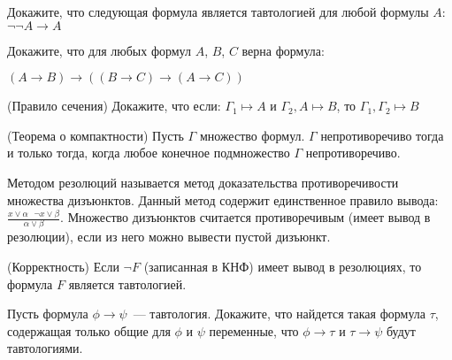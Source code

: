 \setcounter{curtask}{7}


\begin{task}
    Докажите, что следующая формула является тавтологией для любой
    формулы $A$: $\neg\neg A \rightarrow A$
\end{task}

\begin{task}
    Докажите, что для любых формул $A$, $B$, $C$ верна формула:
    \begin{center}
        $(A \rightarrow B) \rightarrow ((B \rightarrow C) \rightarrow (A
	    \rightarrow C))$
    \end{center}
\end{task}

\begin{task} (Правило сечения)
    Докажите, что если: $\Gamma_1 \mapsto A$ и $\Gamma_2, A \mapsto
    B$, то $\Gamma_1, \Gamma_2 \mapsto B$
\end{task}

\begin{task} (Теорема о компактности)
    Пусть $\Gamma$ множество формул. $\Gamma$ непротиворечиво тогда и
    только тогда, когда любое конечное подмножество $\Gamma$ непротиворечиво.
\end{task}

\vspace{0.5cm}
Методом резолюций называется метод доказательства противоречивости
множества дизъюнктов. Данный метод содержит единственное правило
вывода: $\frac{x \vee \alpha \ \ \ \neg x \vee \beta}{\alpha \vee
  \beta}$. Множество дизъюнктов считается противоречивым (имеет вывод
в резолюции), если из него можно вывести пустой дизъюнкт.

\begin{task} (Корректность)
    Если $\neg F$ (записанная в КНФ) имеет вывод в резолюциях, то
    формула $F$ является тавтологией.
\end{task}

\begin{task}
    Пусть формула $\phi \rightarrow \psi$~--- тавтология. Докажите,
    что найдется такая формула $\tau$, содержащая только общие для
    $\phi$ и $\psi$ переменные, что $\phi \rightarrow \tau$ и
    $\tau \rightarrow \psi$ будут тавтологиями.
\end{task}

